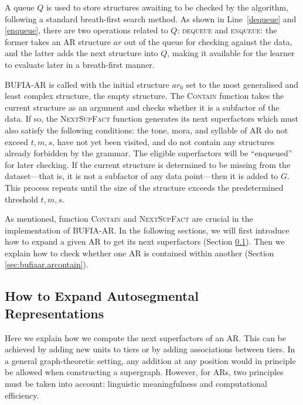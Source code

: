 \documentclass{CUP-JNL-PHO}%
\theoremstyle{definition}
\numberwithin{equation}{section}
\theoremstyle{definition}
\begin{document}
A queue \(Q\) is used to store structures awaiting to be checked by
the algorithm, following a standard breath-first search method. As shown in Line~\ref{dequeue} and \ref{enqueue},
there are two operations related to \(Q\): \textsc{dequeue} and
\textsc{enqueue}: the former takes an AR structure \(ar\) out of the queue
for checking against the data, and the latter adds the next structure
into \(Q\), making it available for the learner to evaluate later in a breath-first
manner.

BUFIA-AR is called with the initial structure \( ar_0 \) set to the most
generalised and least complex structure, the empty structure. The
\textsc{Contain} function takes the current structure as an argument
and checks whether it is a subfactor of the data. If so, the
\textsc{NextSupFact} function generates its next superfactors
which must also satisfy the following conditions: the tone,
mora, and syllable of AR do not exceed \(t, m, s\),
have not yet been visited, and do not contain any structures
already forbidden by the grammar. The eligible superfactors will be
``enqueued'' for later checking. If the current structure is
determined to be missing from the dataset---that is, it is not a
subfactor of any data point---then it is added to $G$. This process
repeats until the size of the structure exceeds the predetermined
threshold \(t, m, s\).

As mentioned, function \textsc{Contain} and \textsc{NextSupFact} are
crucial in the implementation of BUFIA-AR. In the following sections,
we will first introduce how to expand a given AR to get its next
superfactors (Section \ref{sec:bufiaar.nextar}). Then we explain how to check
whether one AR is contained within another (Section
\ref{sec:bufiaar.arcontain}).

\subsection{How to Expand Autosegmental Representations}
\label{sec:bufiaar.nextar}

Here we explain how we compute the next superfactors of an AR. This
can be achieved by adding new units to tiers or by adding associations
between tiers. In a general graph-theoretic setting, any addition at
any position would in principle be allowed when constructing a
supergraph. However, for ARs, two principles must be taken into
account: linguistic meaningfulness and computational efficiency.
\end{document}
